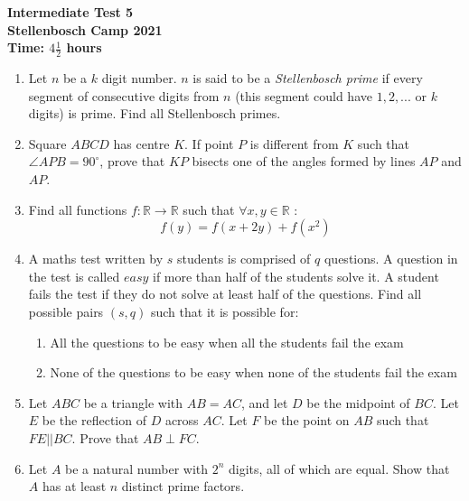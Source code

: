 \documentclass{article}
\begin{document}
\thispagestyle{empty}

\begin{center}
  \textbf{\Large Intermediate Test 5}
  \\ \vspace{1em}
  \textbf{\large Stellenbosch Camp 2021}
  \\ \vspace{1em}
  \textbf{\large Time: $4\frac{1}{2}$ hours}
\end{center}

\bigskip

\begin{enumerate}[itemsep=\fill]

\item %
Let $n$ be a $k$ digit number. $n$ is said to be a \textit{Stellenbosch prime} if every segment of consecutive digits from $n$ (this segment could have $1,2,...$ or $k$ digits) is prime. Find all Stellenbosch primes.


\item %
Square $ABCD$ has centre $K$. If point $P$ is different from $K$ such that $\angle APB = 90^{\circ}$, prove that $KP$ bisects one of the angles formed by lines $AP$ and $AP$.

\item %
Find all functions $f:\mathbb{R} \rightarrow \mathbb{R}$ such that $\forall x,y \in \mathbb{R}$ :
$$f(y) = f(x+2y) + f(x^2)$$

\item %
A maths test written by $s$ students is comprised of $q$ questions. A question in the test is called $easy$ if more than half of the students solve it. A student fails the test if they do not solve at least half of the questions. Find all possible pairs $(s, q)$ such that it is possible for:
\begin{enumerate}
\item All the questions to be easy when all the students fail the exam
\item None of the questions to be easy when none of the students fail the exam 
\end{enumerate}

\item %
Let $ABC$ be a triangle with $AB=AC$, and let $D$ be the midpoint of $BC$. Let $E$ be the reflection of $D$ across $AC$. Let $F$ be the point on $AB$ such that $FE||BC$. Prove that $AB\perp FC$.


\item %
Let $A$ be a natural number with $2^n$ digits, all of which are equal. Show that $A$ has at least $n$ distinct prime factors.

\end{enumerate}
\end{document}
